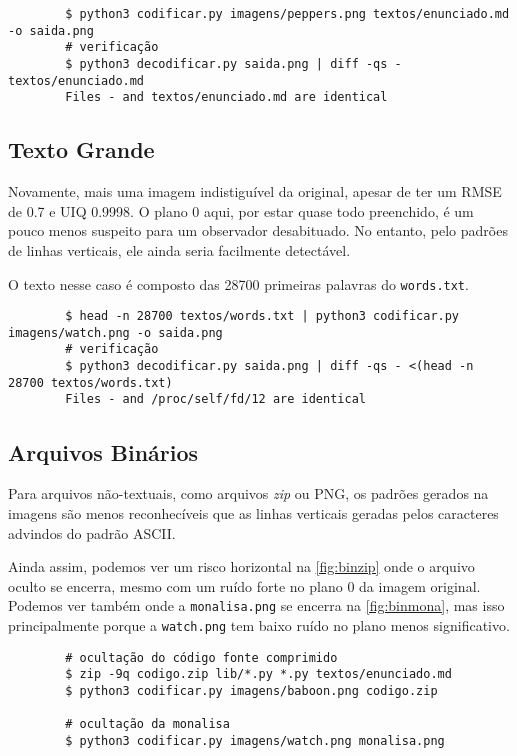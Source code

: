     \begin{verbatim}
        $ python3 codificar.py imagens/peppers.png textos/enunciado.md -o saida.png
        # verificação
        $ python3 decodificar.py saida.png | diff -qs - textos/enunciado.md
        Files - and textos/enunciado.md are identical
    \end{verbatim}

\subsection{Texto Grande}

    

    Novamente, mais uma imagem indistiguível da original, apesar de ter um RMSE de 0.7 e UIQ 0.9998. O plano 0 aqui, por estar quase todo preenchido, é um pouco menos suspeito para um observador desabituado. No entanto, pelo padrões de linhas verticais, ele ainda seria facilmente detectável.

    O texto nesse caso é composto das 28700 primeiras palavras do \texttt{words.txt}.

    \begin{verbatim}
        $ head -n 28700 textos/words.txt | python3 codificar.py imagens/watch.png -o saida.png
        # verificação
        $ python3 decodificar.py saida.png | diff -qs - <(head -n 28700 textos/words.txt)
        Files - and /proc/self/fd/12 are identical
    \end{verbatim}

\subsection{Arquivos Binários} \label{sec:binarios}

    
    

    Para arquivos não-textuais, como arquivos \textit{zip} ou PNG, os padrões gerados na imagens são menos reconhecíveis que as linhas verticais geradas pelos caracteres advindos do padrão ASCII.

    Ainda assim, podemos ver um risco horizontal na \cref{fig:binzip} onde o arquivo oculto se encerra, mesmo com um ruído forte no plano 0 da imagem original. Podemos ver também onde a \texttt{monalisa.png} se encerra na \cref{fig:binmona}, mas isso principalmente porque a \texttt{watch.png} tem baixo ruído no plano menos significativo.

    \begin{verbatim}
        # ocultação do código fonte comprimido
        $ zip -9q codigo.zip lib/*.py *.py textos/enunciado.md
        $ python3 codificar.py imagens/baboon.png codigo.zip

        # ocultação da monalisa
        $ python3 codificar.py imagens/watch.png monalisa.png
    \end{verbatim}


